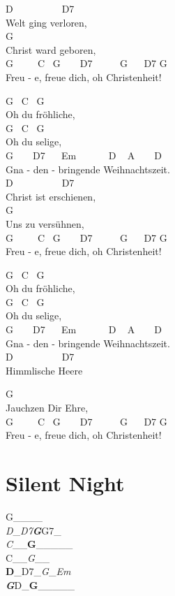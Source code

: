 \documentclass[
  letterpaper,
]{scrbook}
\begin{document}
D ~ ~ ~ ~ ~ ~D7\\
Welt ging verloren,\\
G\\
Christ ward geboren,\\
G ~ ~ ~C ~G ~ ~ D7 ~ ~ ~ G ~ ~D7 G\\
Freu - e, freue dich, oh Christenheit!

G ~C ~G\\
Oh du fröhliche,\\
G ~C ~G\\
Oh du selige,\\
G ~ ~ D7 ~ ~Em ~ ~ ~ ~D ~ A ~ ~ D\\
Gna - den - bringende Weihnachtszeit.\\
D ~ ~ ~ ~ ~ ~D7\\
Christ ist erschienen,\\
G\\
Uns zu versühnen,\\
G ~ ~ ~C ~G ~ ~ D7 ~ ~ ~ G ~ ~D7 G\\
Freu - e, freue dich, oh Christenheit!

G ~C ~G\\
Oh du fröhliche,\\
G ~C ~G\\
Oh du selige,\\
G ~ ~ D7 ~ ~Em ~ ~ ~ ~D ~ A ~ ~ D\\
Gna - den - bringende Weihnachtszeit.\\
D ~ ~ ~ ~ ~ ~D7\\
Himmlische Heere

G\\
Jauchzen Dir Ehre,\\
G ~ ~ ~C ~G ~ ~ D7 ~ ~ ~ G ~ ~D7 G\\
Freu - e, freue dich, oh Christenheit!

\hypertarget{silent-night}{%
\chapter{Silent Night}\label{silent-night}}

G\_\textbf{\textbar{}}\_\emph{\textbar{}}\_\textbf{\textbar{}}\_\emph{\textbar{}\\
D}\_\emph{\textbar D7\textbf{\textbar G}}\textbar G7\_\emph{\textbar{}\\
C}\_\emph{\textbar{}}\_\textbf{\textbar G}\_\textbar\_\_\_\_\textbar{}\\
C\_\textbf{\textbar{}}\_\emph{\textbar G}\_\emph{\textbar{}}\_\textbf{\textbar{}\\
D}\_\textbar D7\_\emph{\textbar G}\_\emph{\textbar Em\textbf{\textbar{}\\
G}}\textbar D\_\textbf{\textbar G}\_\textbar\_\_\_\_\textbar{}
\end{document}
